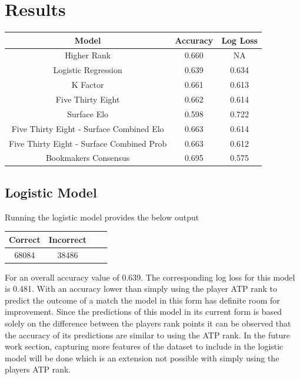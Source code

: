 \documentclass[12pt,a4paper]{article}
\begin{document}
\section{Results}
\begin{center}
  \begin{tabular}{||c c c||}
    \hline
    Model                                     & Accuracy & Log Loss \\
    \hline\hline
    Higher Rank                               & 0.660    & NA       \\
    Logistic Regression                       & 0.639    & 0.634    \\
    K Factor                                  & 0.661    & 0.613    \\
    Five Thirty Eight                         & 0.662    & 0.614    \\
    Surface Elo                               & 0.598    & 0.722    \\
    Five Thirty Eight - Surface Combined Elo  & 0.663    & 0.614    \\
    Five Thirty Eight - Surface Combined Prob & 0.663    & 0.612    \\
    Bookmakers Consensus                      & 0.695    & 0.575    \\
    \hline
  \end{tabular}
\end{center}

\subsection{Logistic Model}
Running the logistic model provides the below output
\begin{center}
  \begin{tabular}{||c c c c||}
    \hline
    Correct & Incorrect \\
    \hline\hline
    68084   & 38486     \\
    \hline
  \end{tabular}
\end{center}
For an overall accuracy value of 0.639. The corresponding log loss for this model is 0.481.
With an accuracy lower than simply using the player ATP rank to predict the outcome of a
match the model in this form has definite room for improvement. Since the predictions of
this model in its current form is based solely on the difference between the players rank
points it can be observed that the accuracy of its predictions are similar to using the ATP
rank. In the future work section, capturing more features of the dataset to include in the
logistic model will be done which is an extension not possible with simply using the players
ATP rank.
\end{document}
